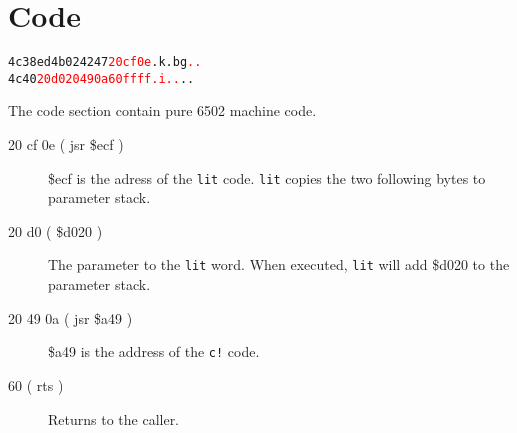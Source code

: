 \section{Code}

\begin{alltt}
4c38  ed 4b 02 42 47 \textcolor{red}{20 cf 0e} .k.bg\textcolor{red}{ ..}
4c40  \textcolor{red}{20 d0 20 49 0a 60 ff ff  . i..}..
\end{alltt}

The code section contain pure 6502 machine code.

\begin{description}
\item[20 cf 0e ( jsr \$ecf )] \$ecf is the adress of the \texttt{lit} code. \texttt{lit} copies the two following bytes to parameter stack.
\item[20 d0 ( \$d020 )] The parameter to the \texttt{lit} word. When executed, \texttt{lit} will add \$d020 to the parameter stack.
\item[20 49 0a ( jsr \$a49 )] \$a49 is the address of the \texttt{c!} code.
\item[60 ( rts )] Returns to the caller.
\end{description}
